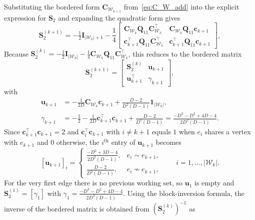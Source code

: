 \documentclass[a4paper,12pt,openany]{book}
\newcommand{\C}{\mathbf{C}}
\newcommand{\I}{\mathbf{I}}
\newcommand{\Q}{\mathbf{Q}}
\renewcommand{\c}{\mathbf{c}}
\renewcommand{\u}{\mathbf{u}}
\begin{document}
\begin{appendices}
Substituting the bordered form $\C_{\mathcal{W}_{k+1}}$ from~\eqref{eq:C_W_add} into the explicit expression for $\mathbf{S}_2$ and expanding the quadratic form gives
\begin{equation}
\mathbf{S}_2^{(k+1)} = -\tfrac12\I_{|\mathcal{W}_k|+1} - \frac14\begin{bmatrix} \C_{\mathcal{W}_k}\Q_{11}\C_{\mathcal{W}_k}^\top & \C_{\mathcal{W}_k}\Q_{11}\c_{k+1} \\ \c_{k+1}^\top\Q_{11}\C_{\mathcal{W}_k}^\top & \c_{k+1}^\top\Q_{11}\c_{k+1} \end{bmatrix},
\end{equation}
Because $\mathbf{S}_2^{(k)} = -\tfrac12\I_{|\mathcal{W}_k|} - \frac14\C_{\mathcal{W}_k}\Q_{11}\C_{\mathcal{W}_k}^\top$, this reduces to the bordered matrix
\begin{equation}\label{eq:S2_update}
\mathbf{S}_2^{(k+1)}=
\begin{bmatrix}
\mathbf{S}_2^{(k)} & \u_{k+1}\\[2pt]
\u_{k+1}^\top & \gamma_{k+1}
\end{bmatrix},
\end{equation}
with
\begin{align}
	\label{eq:u_update_vec}
	\u_{k+1} &= -\frac{1}{2D}\C_{\mathcal{W}_k}\c_{k+1} + \frac{D-2}{D^2(D-1)}\mathbf{1}_{|\mathcal{W}_k|},\\
	\label{eq:gamma_update}
	\gamma_{k+1} &= -\frac12 - \frac{1}{2D}\c_{k+1}^\top\c_{k+1} + \frac{D-2}{D^2(D-1)} = \frac{-D^3-D^2+4D-4}{2D^2(D-1)}.
\end{align}
Since $\c_{k+1}^\top\c_{k+1}=2$ and $\c_i^\top\c_{k+1}$ with $i\neq k+1$ equals $1$ when $e_i$ shares a vertex with $e_{k+1}$ and $0$ otherwise, the $i^\text{th}$ entry of $\u_{k+1}$ becomes
\begin{equation}
	\label{eq:u_entrywise_derived}
	[\u_{k+1}]_i=
	\begin{cases}
		\displaystyle\frac{-D^2+3D-4}{2D^2(D-1)}, & e_i\sim e_{k+1},\\[8pt]
		\displaystyle\frac{D-2}{D^2(D-1)}, & e_i\not\sim e_{k+1},
	\end{cases}
	\qquad i=1,\dots,|\mathcal{W}_k|.
\end{equation}
For the very first edge there is no previous working set, so $\u_1$ is empty and $\mathbf{S}_2^{(1)}=[\gamma_1]$ with $\gamma_1=\frac{-D^3-D^2+4D-4}{2D^2(D-1)}$. Using the block-inversion formula, the inverse of the bordered matrix is obtained from $(\mathbf{S}_2^{(k)})^{-1}$ as
\begin{equation}\label{eq:S2_inv_update}

\end{equation}
\end{appendices}
\end{document}
